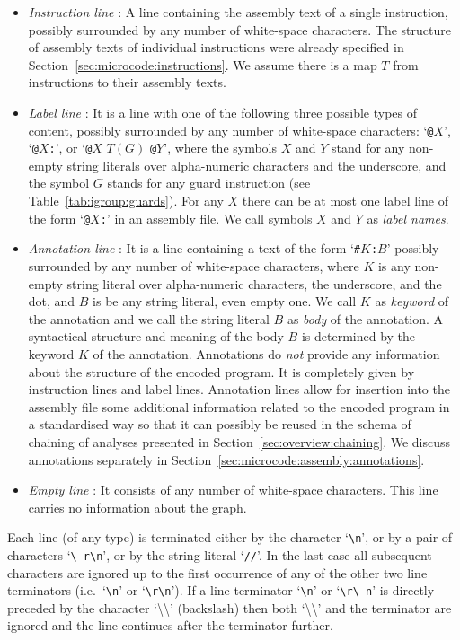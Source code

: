 \documentclass[10pt,twocolumn]{article}
\begin{document}
\begin{itemize}
\item \emph{Instruction line} : A line containing the assembly text of a single
instruction, possibly surrounded by any number of white-space characters. The
structure of assembly texts of individual instructions were already specified in
Section~\ref{sec:microcode:instructions}. We assume there is a map $ T $ from
instructions to their assembly texts.%

\item \emph{Label line} : It is a line with one of the following three possible
types of content, possibly surrounded by any number of white-space characters:
`\texttt{@}$ X $', `\texttt{@}$ X $\texttt{:}', or `\texttt{@}$ X $ $ T(G) $
\texttt{@}$ Y $', where the symbols $ X $ and $ Y $ stand for any non-empty
string literals over alpha-numeric characters and the underscore, and the symbol
$ G $ stands for any guard instruction (see Table~\ref{tab:igroup:guards}). For
any $ X $ there can be at most one label line of the form `\texttt{@}$ X
$\texttt{:}' in an assembly file. We call symbols $ X $ and $ Y $ as \emph{label
names}. %

\item \emph{Annotation line} : It is a line containing a text of the form
`\texttt{\#}$ K $\texttt{:}$ B $' possibly surrounded by any number of
white-space characters, where $ K $ is any non-empty string literal over
alpha-numeric characters, the underscore, and the dot, and $ B $ is be any
string literal, even empty one. We call $ K $ as \emph{keyword} of the
annotation and we call the string literal $ B $ as \emph{body} of the
annotation. A syntactical structure and meaning of the body $ B $ is determined
by the keyword $ K $ of the annotation. Annotations do \emph{not} provide any
information about the structure of the encoded program. It is completely given
by instruction lines and label lines. Annotation lines allow for insertion into
the assembly file some additional information related to the encoded program in
a standardised way so that it can possibly be reused in the schema of chaining
of analyses presented in Section~\ref{sec:overview:chaining}. We discuss
annotations separately in Section~\ref{sec:microcode:assembly:annotations}.

%

\item \emph{Empty line} : It consists of any number of white-space characters. This
line carries no information about the graph. %
\end{itemize}
Each line (of any type) is terminated either by the character
`\texttt{\textbackslash n}', or by a pair of characters `\texttt{\textbackslash
r}\texttt{\textbackslash n}', or by the string literal `\texttt{//}'. In the
last case all subsequent characters are ignored up to the first occurrence of
any of the other two line terminators (i.e.~`\texttt{\textbackslash n}' or
`\texttt{\textbackslash r}\texttt{\textbackslash n}'). If a line terminator
`\texttt{\textbackslash n}' or `\texttt{\textbackslash r}\texttt{\textbackslash
n}' is directly preceded by the character `\textbackslash\textbackslash'
(backslash) then both `\textbackslash\textbackslash' and the terminator are
ignored and the line continues after the terminator further.
\end{document}
